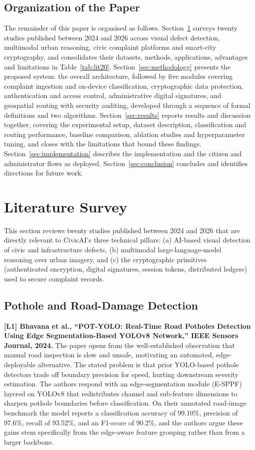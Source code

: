 \documentclass[conference]{IEEEtran}
\begin{document}
\subsection{Organization of the Paper}
The remainder of this paper is organised as follows. Section~\ref{sec:litreview} surveys twenty studies published between 2024 and 2026 across visual defect detection, multimodal urban reasoning, civic complaint platforms and smart-city cryptography, and consolidates their datasets, methods, applications, advantages and limitations in Table~\ref{tab:lit20}. Section~\ref{sec:methodology} presents the proposed system: the overall architecture, followed by five modules covering complaint ingestion and on-device classification, cryptographic data protection, authentication and access control, administrative digital signatures, and geospatial routing with security auditing, developed through a sequence of formal definitions and two algorithms. Section~\ref{sec:results} reports results and discussion together, covering the experimental setup, dataset description, classification and routing performance, baseline comparison, ablation studies and hyperparameter tuning, and closes with the limitations that bound these findings. Section~\ref{sec:implementation} describes the implementation and the citizen and administrator flows as deployed. Section~\ref{sec:conclusion} concludes and identifies directions for future work.

\section{Literature Survey}
\label{sec:litreview}

This section reviews twenty studies published between 2024 and 2026 that are directly relevant to CivicAI's three technical pillars: (a) AI-based visual detection of civic and infrastructure defects, (b) multimodal large-language-model reasoning over urban imagery, and (c) the cryptographic primitives (authenticated encryption, digital signatures, session tokens, distributed ledgers) used to secure complaint records.

\subsection{Pothole and Road-Damage Detection}

\textbf{[L1] Bhavana et al., ``POT-YOLO: Real-Time Road Potholes Detection Using Edge Segmentation-Based YOLOv8 Network,'' IEEE Sensors Journal, 2024.} The paper opens from the well-established observation that manual road inspection is slow and unsafe, motivating an automated, edge-deployable alternative. The stated problem is that prior YOLO-based pothole detectors trade off boundary precision for speed, hurting downstream severity estimation. The authors respond with an edge-segmentation module (E-SPPF) layered on YOLOv8 that redistributes channel and sub-feature dimensions to sharpen pothole boundaries before classification. On their annotated road-image benchmark the model reports a classification accuracy of 99.10\%, precision of 97.6\%, recall of 93.52\%, and an F1-score of 90.2\%, and the authors argue these gains stem specifically from the edge-aware feature grouping rather than from a larger backbone.
\end{document}
